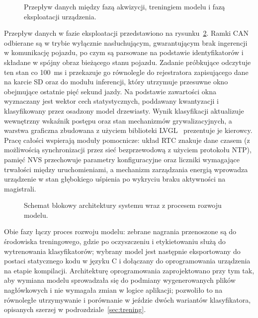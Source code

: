 \begin{figure}[!h]
    \centering
    \resizebox{0.85\linewidth}{!}{}
    \caption{Przepływ danych między fazą akwizycji, treningiem modelu i fazą eksploatacji urządzenia.}
    \label{fig:cykl-faz}
\end{figure}

Przepływ danych w fazie eksploatacji przedstawiono na
rysunku~\ref{fig:architektura}. Ramki CAN odbierane są w trybie wyłącznie
nasłuchującym, gwarantującym brak ingerencji w komunikację pojazdu, po czym są
parsowane na podstawie identyfikatorów i składane w spójny obraz bieżącego
stanu pojazdu. Zadanie próbkujące odczytuje ten stan co 100~ms i przekazuje go
równolegle do rejestratora zapisującego dane na karcie SD oraz do
modułu inferencji, który utrzymuje przesuwne okno obejmujące ostatnie pięć
sekund jazdy. Na podstawie zawartości okna wyznaczany jest wektor cech
statystycznych, poddawany kwantyzacji i klasyfikowany przez osadzony model
drzewiasty. Wynik klasyfikacji aktualizuje wewnętrzny wskaźnik postępu oraz
stan mechanizmów grywalizacyjnych, a warstwa graficzna zbudowana z użyciem
biblioteki LVGL~\cite{lvgl} prezentuje je kierowcy. Pracę całości wspierają moduły
pomocnicze: układ RTC znakuje dane czasem (z możliwością synchronizacji przez
sieć bezprzewodową z użyciem protokołu NTP), pamięć NVS przechowuje parametry
konfiguracyjne oraz liczniki wymagające trwałości między uruchomieniami,
a mechanizm zarządzania energią wprowadza urządzenie w stan głębokiego uśpienia
po wykryciu braku aktywności na magistrali.

\begin{figure}[!h]
    \centering
    \resizebox{\linewidth}{!}{}
    \caption{Schemat blokowy architektury systemu wraz z procesem rozwoju modelu.}
    \label{fig:architektura}
\end{figure}

Obie fazy łączy proces rozwoju modelu: zebrane nagrania przenoszone są do
środowiska treningowego, gdzie po oczyszczeniu i etykietowaniu służą do
wytrenowania klasyfikatorów; wybrany model jest następnie eksportowany do
postaci statycznego kodu w języku C i dołączany do oprogramowania urządzenia
na etapie kompilacji. Architekturę oprogramowania zaprojektowano przy tym tak,
aby wymiana modelu sprowadzała się do podmiany wygenerowanych plików
nagłówkowych i nie wymagała zmian w logice aplikacji; pozwoliło to na
równoległe utrzymywanie i porównanie w jeździe dwóch wariantów klasyfikatora,
opisanych szerzej w podrozdziale~\ref{sec:trening}.

